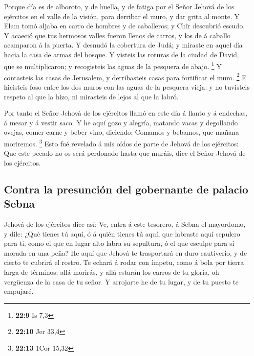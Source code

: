  Porque día es de alboroto, y de huella, y de fatiga por
el Señor Jehová de los ejércitos en el valle de la visión, para derribar
el muro, y dar grita al monte.  Y Elam tomó aljaba en
carro de hombres y de caballeros; y Chîr descubrió escudo.
 Y acaeció que tus hermosos valles fueron llenos de
carros, y los de á caballo acamparon á la puerta.  Y
desnudó la cobertura de Judá; y miraste en aquel día hacia la casa de
armas del bosque.  Y visteis las roturas de la ciudad de
David, que se multiplicaron; y recogisteis las aguas de la pesquera de
abajo. \footnote{\textbf{22:9} Is 7,3}  Y contasteis las
casas de Jerusalem, y derribasteis casas para fortificar el muro.
\footnote{\textbf{22:10} Jer 33,4}  E hicisteis foso
entre los dos muros con las aguas de la pesquera vieja: y no tuvisteis
respeto al que la hizo, ni mirasteis de lejos al que la labró.

 Por tanto el Señor Jehová de los ejércitos llamó en este
día á llanto y á endechas, á mesar y á vestir saco.  Y he
aquí gozo y alegría, matando vacas y degollando ovejas, comer carne y
beber vino, diciendo: Comamos y bebamos, que mañana moriremos.
\footnote{\textbf{22:13} 1Cor 15,32}  Esto fué revelado á
mis oídos de parte de Jehová de los ejércitos: Que este pecado no os
será perdonado hasta que muráis, dice el Señor Jehová de los ejércitos.

\hypertarget{contra-la-presunciuxf3n-del-gobernante-de-palacio-sebna}{%
\subsection{Contra la presunción del gobernante de palacio
Sebna}\label{contra-la-presunciuxf3n-del-gobernante-de-palacio-sebna}}

 Jehová de los ejércitos dice así: Ve, entra á este
tesorero, á Sebna el mayordomo, y dile:  ¿Qué tienes tú
aquí, ó á quién tienes tú aquí, que labraste aquí sepulcro para ti, como
el que en lugar alto labra su sepultura, ó el que esculpe para sí morada
en una peña?  He aquí que Jehová te trasportará en duro
cautiverio, y de cierto te cubrirá el rostro.  Te echará
á rodar con ímpetu, como á bola por tierra larga de términos: allá
morirás, y allá estarán los carros de tu gloria, oh vergüenza de la casa
de tu señor.  Y arrojarte he de tu lugar, y de tu puesto
te empujaré.

